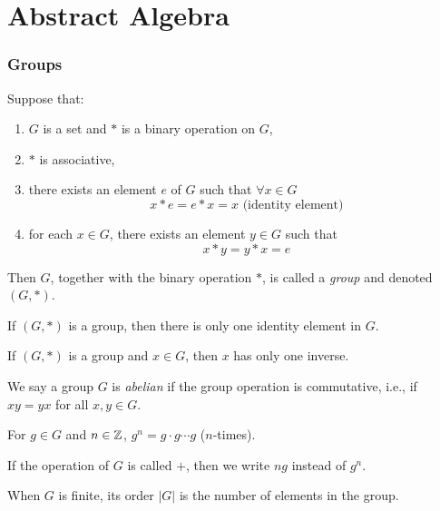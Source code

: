 \part*{Abstract Algebra}

\section*{Groups}

\begin{definition}
	Suppose that:
	\begin{enumerate}
		\item $G$ is a set and $*$ is a binary operation on $G$,
		\item $*$ is associative,
		\item there exists an element $e$ of $G$ such that $\forall x \in G$ \[x
			* e = e * x = x \text{ (identity element)}\]
		\item for each $x \in G$, there exists an element $y \in G$ such that
			\[x * y = y * x = e\]
	\end{enumerate}
	Then $G$, together with the binary operation $*$, is called a
	\emph{group} and denoted $(G, *)$.
\end{definition}

\begin{theorem}
	If $(G, *)$ is a group, then there is only one identity element in $G$.
\end{theorem}

\begin{theorem}
	If $(G, *)$ is a group and $x \in G$, then $x$ has only one inverse.
\end{theorem}

\begin{definition}
	We say a group $G$ is \emph{abelian} if the group operation is commutative,
	i.e., if $xy = yx$ for all $x, y \in G$.
\end{definition}

\begin{notation}
	For $g \in G$ and $n \in {\mathbb{Z}}$, $g^n = g \cdot g \cdots g$ ($n$-times).
\end{notation}

\begin{notation}
	If the operation of $G$ is called $+$, then we write $ng$ instead of $g^n$.
\end{notation}

\begin{notation}
	When $G$ is finite, its order $|G|$ is the number of elements in the group.
\end{notation}

